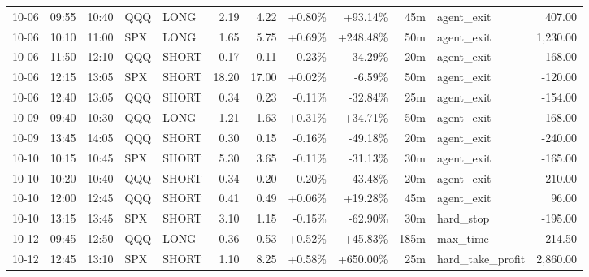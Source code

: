 \documentclass[11pt,a4paper,twoside]{article}
\begin{document}
\begin{center}
\begin{longtable}{>{\color{txtmain}}l l l l l r r r r r >{\color{txtmain}}l r}
10-06 & 09:55 & 10:40 & QQQ & LONG & 2.19 & 4.22 & \textcolor{wingreen}{+0.80\%} & \textcolor{wingreen}{+93.14\%} & 45m & agent\_exit & \textcolor{wingreen}{407.00} \\
10-06 & 10:10 & 11:00 & SPX & LONG & 1.65 & 5.75 & \textcolor{wingreen}{+0.69\%} & \textcolor{wingreen}{+248.48\%} & 50m & agent\_exit & \textcolor{wingreen}{1,230.00} \\
10-06 & 11:50 & 12:10 & QQQ & SHORT & 0.17 & 0.11 & \textcolor{lossred}{-0.23\%} & \textcolor{lossred}{-34.29\%} & 20m & agent\_exit & \textcolor{lossred}{-168.00} \\
10-06 & 12:15 & 13:05 & SPX & SHORT & 18.20 & 17.00 & \textcolor{wingreen}{+0.02\%} & \textcolor{lossred}{-6.59\%} & 50m & agent\_exit & \textcolor{lossred}{-120.00} \\
10-06 & 12:40 & 13:05 & QQQ & SHORT & 0.34 & 0.23 & \textcolor{lossred}{-0.11\%} & \textcolor{lossred}{-32.84\%} & 25m & agent\_exit & \textcolor{lossred}{-154.00} \\
10-09 & 09:40 & 10:30 & QQQ & LONG & 1.21 & 1.63 & \textcolor{wingreen}{+0.31\%} & \textcolor{wingreen}{+34.71\%} & 50m & agent\_exit & \textcolor{wingreen}{168.00} \\
10-09 & 13:45 & 14:05 & QQQ & SHORT & 0.30 & 0.15 & \textcolor{lossred}{-0.16\%} & \textcolor{lossred}{-49.18\%} & 20m & agent\_exit & \textcolor{lossred}{-240.00} \\
10-10 & 10:15 & 10:45 & SPX & SHORT & 5.30 & 3.65 & \textcolor{lossred}{-0.11\%} & \textcolor{lossred}{-31.13\%} & 30m & agent\_exit & \textcolor{lossred}{-165.00} \\
10-10 & 10:20 & 10:40 & QQQ & SHORT & 0.34 & 0.20 & \textcolor{lossred}{-0.20\%} & \textcolor{lossred}{-43.48\%} & 20m & agent\_exit & \textcolor{lossred}{-210.00} \\
10-10 & 12:00 & 12:45 & QQQ & SHORT & 0.41 & 0.49 & \textcolor{wingreen}{+0.06\%} & \textcolor{wingreen}{+19.28\%} & 45m & agent\_exit & \textcolor{wingreen}{96.00} \\
10-10 & 13:15 & 13:45 & SPX & SHORT & 3.10 & 1.15 & \textcolor{lossred}{-0.15\%} & \textcolor{lossred}{-62.90\%} & 30m & hard\_stop & \textcolor{lossred}{-195.00} \\
10-12 & 09:45 & 12:50 & QQQ & LONG & 0.36 & 0.53 & \textcolor{wingreen}{+0.52\%} & \textcolor{wingreen}{+45.83\%} & 185m & max\_time & \textcolor{wingreen}{214.50} \\
10-12 & 12:45 & 13:10 & SPX & SHORT & 1.10 & 8.25 & \textcolor{wingreen}{+0.58\%} & \textcolor{wingreen}{+650.00\%} & 25m & hard\_take\_profit & \textcolor{wingreen}{2,860.00} \\

\end{longtable}
\end{center}
\end{document}
